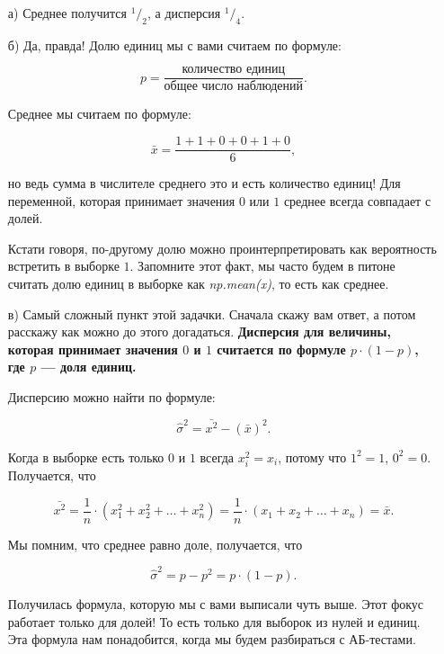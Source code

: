 \documentclass[12pt, a4paper, oneside]{article}
\newcommand{\fr}[2]{\ensuremath{^{#1}/_{#2}}}   %
\theoremstyle{plain} %
\theoremstyle{definition}
\newcommand{\indef}[1]{\textbf{ \color{green} #1}}
\begin{document}
\begin{solution}
\begin{enumerate}
    \item[а)] Среднее получится $\fr{1}{2}$, а дисперсия $\fr{1}{4}$.
    \item[б)] Да, правда! Долю единиц мы с вами считаем по формуле: 
    
    $$
    p = \frac{\text{количество единиц}}{\text{общее число наблюдений}}.
    $$
    
    Среднее мы считаем по формуле: 
    
    $$
    \bar x = \frac{1 + 1 + 0 + 0 + 1 + 0}{6},
    $$
    
    но ведь сумма в числителе среднего это и есть количество единиц! Для переменной, которая принимает значения $0$ или $1$ среднее всегда совпадает с долей.
    
    Кстати говоря, по-другому долю можно проинтерпретировать как вероятность встретить в выборке $1$. Запомните этот факт, мы часто будем в питоне считать долю единиц в выборке как \textit{np.mean(x)}, то есть как среднее.

    \item[в)] Самый сложный пункт этой задачки. Сначала скажу вам ответ, а потом расскажу как можно до этого догадаться. \indef{Дисперсия для величины, которая принимает значения $0$ и $1$ считается по формуле $p \cdot (1 - p)$, где $p$ --- доля единиц.}
    
    Дисперсию можно найти по формуле: 
    
    $$
    \hat \sigma^2 = \bar{x^2} - (\bar x)^2.
    $$
    
    Когда в выборке есть только $0$ и $1$ всегда $x_i^2 = x_i$, потому что $1^2 = 1$, $0^2 = 0$. Получается, что 
    
    $$
    \bar{x^2} = \frac{1}{n} \cdot (x_1^2 + x_2^2 + \ldots + x_n^2) = \frac{1}{n} \cdot (x_1 + x_2 + \ldots + x_n) = \bar x.  
    $$
    
    Мы помним, что среднее равно доле, получается, что 
    
     $$
    \hat \sigma^2 = p - p^2 = p \cdot (1-p).
    $$
    
    Получилась формула, которую мы с вами выписали чуть выше. Этот фокус работает только для долей! То есть только для выборок из нулей и единиц. Эта формула нам понадобится, когда мы будем разбираться с АБ-тестами. 
\end{enumerate}
\end{solution}
\end{document}
